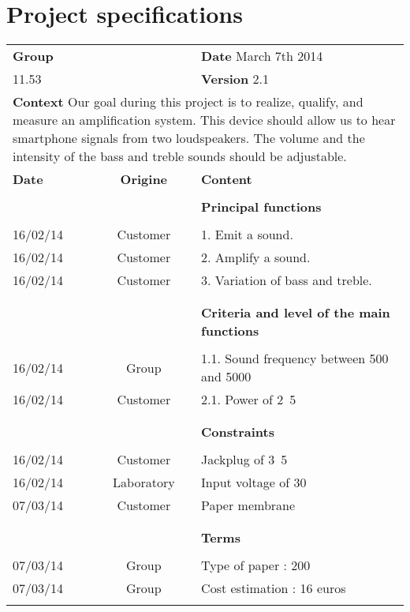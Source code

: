 

\section{Project specifications}

\begin{table}[!htb]
	\centering
	\begin{tabular}{|l|c|l|}
	\hline
	\textbf{Group} & & \hfill \textbf{Date}  March 7th 2014\\
	11.53 && \hfill \textbf{Version} 2.1\\

	\hline
	\multicolumn{3}{|p{15cm}|}{\textbf{Context} \newline
	Our goal during this project is to realize, qualify, and measure an amplification system. This device should allow us to hear smartphone signals from two loudspeakers. The volume and the intensity of the bass and treble sounds should be adjustable.}  \\


	\hline
	\textbf{Date} & \textbf{Origine} & \textbf{Content}\\
		\hline
		&&\\
		&&\textbf{Principal functions}\\
		&&\\
		16/02/14 & Customer & 1. Emit a sound. \\
		16/02/14 & Customer & 2. Amplify a sound. \\
		16/02/14 & Customer & 3. Variation of bass and treble. \\
		&&\\
		\hline
		&&\\
		& & \textbf{Criteria and level of the main functions} \\
		&&\\
		16/02/14 & Group & 1.1. Sound frequency between \unit{500}{\hertz} and \unit{5000}{\hertz} \\
		16/02/14 & Customer & 2.1. Power of \unit{2.5}{\watt} \\
		&&\\
		\hline
		&&\\
		& & \textbf{Constraints} \\
		&&\\
		16/02/14 & Customer &   Jackplug of \unit{3.5}{\milli\meter}\\
		16/02/14 & Laboratory &  Input voltage of \unit{30}{\volt} \\
		07/03/14 & Customer &  Paper membrane \\
		&&\\
		\hline
		&&\\
		& & \textbf{Terms} \\
		&&\\
		07/03/14 & Group & Type of paper : \unit{200}{\gram\per\meter\squared} \\
		07/03/14 & Group & Cost estimation : 16 euros\\

		&&\\
		\hline
	\end{tabular}
\end{table}


